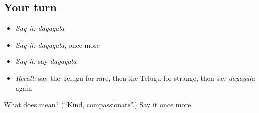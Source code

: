 \subsection*{Your turn}
\begin{itemize}
\raggedright
  \item \emph{Say it:} \emph{dayagala}
  \item \emph{Say it:} \emph{dayagala}, once more
  \item \emph{Say it:} say \emph{dayagala}
  \item \emph{Recall:} say the Telugu for rare, then the Telugu for strange, then say \emph{dayagala} again
\end{itemize}

\begin{tcolorbox}[breakable,colback=teal!4,colframe=teal!35!black,title={Before you move on}]
What does  mean? (\textquotedblleft{}Kind, compassionate\textquotedblright{}.) Say it once more.
\end{tcolorbox}
